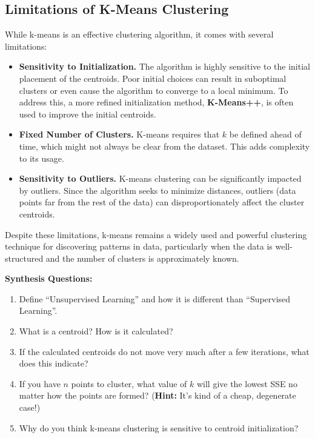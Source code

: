 \subsection{Limitations of K-Means Clustering}
\begin{flushleft}
    \large While k-means is an effective clustering algorithm, it comes with several limitations:
    
    \begin{itemize}
        \item \textbf{Sensitivity to Initialization.} The algorithm is highly sensitive to the initial placement of the centroids. Poor initial choices can result in suboptimal clusters or even cause the algorithm to converge to a local minimum. To address this, a more refined initialization method, \textbf{K-Means++}, is often used to improve the initial centroids.
        
        \item \textbf{Fixed Number of Clusters.} K-means requires that \( k \) be defined ahead of time, which might not always be clear from the dataset. This adds complexity to its usage.
        
        \item \textbf{Sensitivity to Outliers.} K-means clustering can be significantly impacted by outliers. Since the algorithm seeks to minimize distances, outliers (data points far from the rest of the data) can disproportionately affect the cluster centroids.
    \end{itemize}
    
    Despite these limitations, k-means remains a widely used and powerful clustering technique for discovering patterns in data, particularly when the data is well-structured and the number of clusters is approximately known.
\end{flushleft}

\begin{questionbox}
\textbf{Synthesis Questions:}
\begin{enumerate}
    \item Define ``Unsupervised Learning'' and how it is different than ``Supervised Learning''.
    \item What is a centroid? How is it calculated?
    \item If the calculated centroids do not move very much after a few iterations, what does this indicate?
    \item If you have $n$ points to cluster, what value of $k$ will give the lowest SSE no matter how the points are formed? (\textbf{Hint:} It's kind of a cheap, degenerate case!)
    \item Why do you think k-means clustering is sensitive to centroid initialization?
\end{enumerate}
\end{questionbox}

